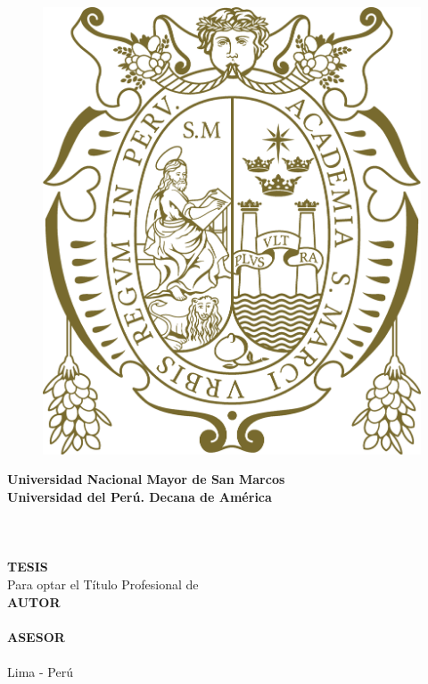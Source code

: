 \begin{titlepage}	
	\begin{center}
		\begin{figure}[H]
			\centering 
			\includegraphics[scale=0.05]{img/1_caratula/unmsm.eps}
		\end{figure}
		{\LARGE \textbf{Universidad Nacional Mayor de San Marcos}}\\
		{\textbf{Universidad del Perú. Decana de América}}\\
		{\large \@facultad}\\
		{\large \@eap}\\
		\vspace{15mm}
	    {\LARGE \textbf{\@titlecaratula}}\\		
		\singlespacing  %
		\vspace{15mm}	
		{\Large \textbf{TESIS}}\\
		\vspace{5mm}
		{\large Para optar el Título Profesional de \@grado}\\
		\vspace{15mm}
		{\Large \textbf{AUTOR}}\\
		\vspace{5mm}	
		{\large \@authorcaratula}\\
		\vspace{15mm}
		{\Large \textbf{ASESOR}}\\
		\vspace{5mm}
		{\large \@asesor}\\
		\vspace{15mm}
		{\large Lima - Perú}\\
		\vspace{5mm}	
		{\large \@yyearr}\\
	\end{center}
\end{titlepage}
